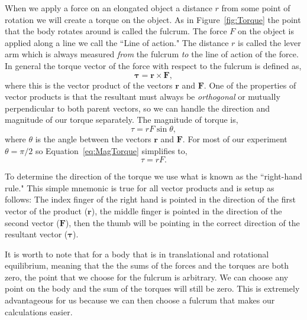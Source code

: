 \documentclass[main.tex]{subfiles}
\begin{document}
When we apply a force on an elongated object a distance $r$ from some point of rotation we will create a torque on the object. As in Figure~\ref{fig:Torque} the point that the body rotates around is called the fulcrum. The force $F$ on the object is applied along a line we call the ``Line of action." The distance $r$ is called the lever arm which is always measured \emph{from} the fulcrum \emph{to} the line of action of the force. In general the torque vector of the force with respect to the fulcrum is defined as,
\begin{equation} \label{eq:VectTorque}
\boldsymbol{\tau}=\mathbf{r} \times \mathbf{F},
\end{equation}
where this is the vector product of the vectors $\mathbf{r}$ and $\mathbf{F}.$ One of the properties of vector products is that the resultant must always be \emph{orthogonal} or mutually perpendicular to both parent vectors, so we can handle the direction and magnitude of our torque separately. The magnitude of torque is,
\begin{equation} \label{eq:MagTorque}
\tau=rF\sin\theta,
\end{equation}
where $\theta$ is the angle between the vectors $\mathbf{r}$ and $\mathbf{F}.$ For most of our experiment $\theta=\pi/2$ so Equation~\eqref{eq:MagTorque} simplifies to,
\begin{equation} 
\tau=rF.
\end{equation}

To determine the direction of the torque we use what is known as the ``right-hand rule." This simple mnemonic is true for all vector products and is setup as follows: The index finger of the right hand is pointed in the direction of the first vector of the product ($\mathbf{r}$), the middle finger is pointed in the direction of the second vector ($\mathbf{F}$), then the thumb will be pointing in the correct direction of the resultant vector ($\boldsymbol{\tau}$).

It is worth to note that for a body that is in translational and rotational equilibrium, meaning that the the sums of the forces and the torques are both zero, the point that we choose for the fulcrum is arbitrary. We can choose any point on the body and the sum of the torques will still be zero. This is extremely advantageous for us because we can then choose a fulcrum that makes our calculations easier.
\end{document}

